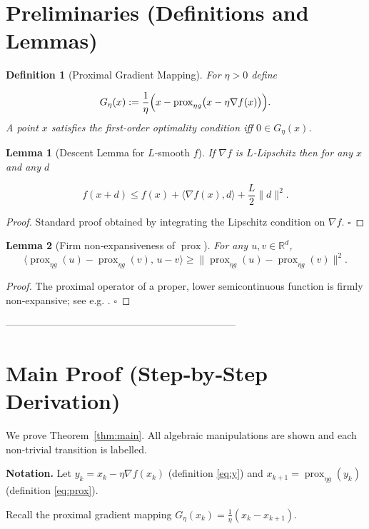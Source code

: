 \documentclass{article}
\newtheorem{lemma}{Lemma}
\newtheorem{definition}{Definition}
\newcommand{\prox}{\operatorname{prox}}
\newcommand{\grad}{\nabla}
\newcommand{\R}{\mathbb{R}}
\begin{document}
\section*{Preliminaries (Definitions and Lemmas)}
\begin{definition}[Proximal Gradient Mapping]\label{def:G}
For $\eta>0$ define  

\[
G_{\eta}(x):=\frac{1}{\eta}\Bigl(x-\prox_{\eta g}\bigl(x-\eta\grad f(x)\bigr)\Bigr).
\]
A point $x$ satisfies the first‑order optimality condition iff $0\in G_{\eta}(x)$.
\end{definition}

\begin{lemma}[Descent Lemma for $L$‑smooth $f$]\label{lem:descent}
If $\grad f$ is $L$‑Lipschitz then for any $x$ and any $d$  

\[
f(x+d)\le f(x)+\langle\grad f(x),d\rangle+\frac{L}{2}\|d\|^{2}.
\]
\end{lemma}
\begin{proof}
Standard proof obtained by integrating the Lipschitz condition on $\grad f$. \hfill $\square$
\end{proof}

\begin{lemma}[Firm non‑expansiveness of $\prox$]\label{lem:firm}
For any $u,v\in\R^{d}$,
\[
\big\langle\prox_{\eta g}(u)-\prox_{\eta g}(v),\,u-v\big\rangle
\ge \|\prox_{\eta g}(u)-\prox_{\eta g}(v)\|^{2}.
\tag{L1}
\]
\end{lemma}
\begin{proof}
The proximal operator of a proper, lower semicontinuous function is firmly non‑expansive; see e.g. \cite{prox_book}. \hfill $\square$
\end{proof}

---------------------------------------------------------------------

\section*{Main Proof (Step‑by‑Step Derivation)}
We prove Theorem~\ref{thm:main}.  All algebraic manipulations are shown and each non‑trivial transition is labelled.

\medskip
\noindent\textbf{Notation.} Let $y_{k}=x_{k}-\eta\grad f(x_{k})$ (definition \eqref{eq:y}) and $x_{k+1}= \prox_{\eta g}(y_{k})$ (definition \eqref{eq:prox}).  

Recall the proximal gradient mapping $G_{\eta}(x_{k})=\frac{1}{\eta}(x_{k}-x_{k+1})$.
\end{document}
